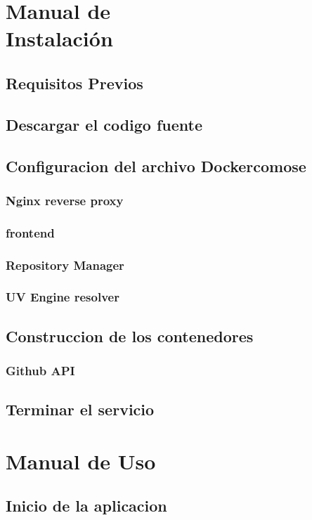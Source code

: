\documentclass[12pt, a4paper, twoside]{article}
\begin{document}
\begin{umaappendices}
    \section{Manual de \\ Instalación}
	\subsection{Requisitos Previos}
	\subsection{Descargar el codigo fuente}
	\subsection{Configuracion del archivo Dockercomose}
	\subsubsection{Nginx reverse proxy}
	\subsubsection{frontend}
	\subsubsection{Repository Manager}
	\subsubsection{UV Engine resolver}
	\subsection{Construccion de los contenedores}
	\subsubsection{Github API}
	\subsection{Terminar el servicio}



    \section{Manual de Uso}
	\subsection{Inicio de la aplicacion}

\end{umaappendices}
\end{document}
